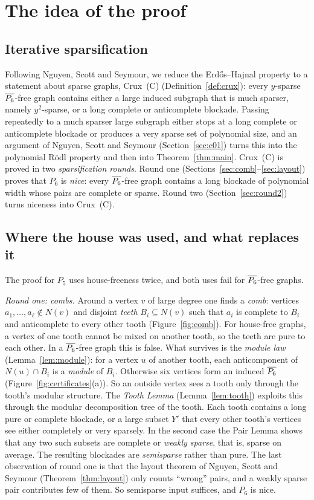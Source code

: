 \section*{The idea of the proof}

\subsection*{Iterative sparsification}
Following Nguyen, Scott and Seymour, we reduce the Erd\H{o}s--Hajnal property to a statement about sparse
graphs, Crux~(C) (Definition~\ref{def:crux}): every $y$-sparse $\overline{P_6}$-free graph contains either a large
induced subgraph that is much sparser, namely $y^2$-sparse, or a long complete or anticomplete blockade.
Passing repeatedly to a much sparser large subgraph either stops at a long complete or anticomplete
blockade or produces a very sparse set of polynomial size, and an argument of Nguyen, Scott and Seymour
(Section~\ref{sec:c01}) turns this into the polynomial R\"odl property and then into
Theorem~\ref{thm:main}. Crux~(C) is proved in two
\emph{sparsification rounds}. Round one (Sections~\ref{sec:comb}--\ref{sec:layout}) proves that $P_6$ is
\emph{nice}: every $\overline{P_6}$-free graph contains a long blockade of polynomial width whose pairs are complete
or sparse. Round two (Section~\ref{sec:round2}) turns niceness into Crux~(C).

\subsection*{Where the house was used, and what replaces it}
The proof for $P_5$ uses house-freeness twice, and both uses fail for $\overline{P_6}$-free graphs.

\emph{Round one: combs.} Around a vertex $v$ of large degree one finds a \emph{comb}: vertices
$a_1,\dots,a_\ell\notin N(v)$ and disjoint \emph{teeth} $B_i\subseteq N(v)$ such that $a_i$ is complete to
$B_i$ and anticomplete to every other tooth (Figure~\ref{fig:comb}). For house-free graphs, a vertex of one
tooth cannot be mixed on another tooth, so the teeth are pure to each other. In a $\overline{P_6}$-free graph this
is false. What survives is the \emph{module law} (Lemma~\ref{lem:module}): for a vertex $u$ of another
tooth, each anticomponent of $N(u)\cap B_i$ is a \emph{module} of $B_i$. Otherwise six vertices form an
induced $\overline{P_6}$ (Figure~\ref{fig:certificates}(a)). So an outside vertex sees a tooth only through the
tooth's modular structure. The \emph{Tooth Lemma} (Lemma~\ref{lem:tooth}) exploits this through the
modular decomposition tree of the tooth. Each tooth contains a long pure or complete blockade, or a large
subset $Y'$ that every other tooth's vertices see either completely or very sparsely. In the second case
the Pair Lemma shows that any two such subsets are complete or \emph{weakly sparse}, that is, sparse on
average. The resulting blockades are \emph{semisparse} rather than pure. The last observation of round
one is that the layout theorem of Nguyen, Scott and Seymour (Theorem~\ref{thm:layout}) only counts
``wrong'' pairs, and a weakly sparse pair contributes few of them. So semisparse input suffices, and
$P_6$ is nice.

